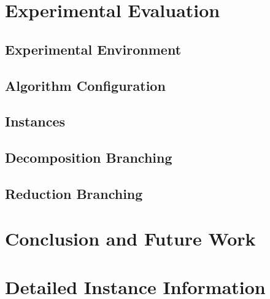 \documentclass[a4paper,UKenglish,cleveref, autoref, thm-restate]{lipics-v2021}
\begin{document}

\section{Experimental Evaluation}

\subsection{Experimental Environment}

\subsection{Algorithm Configuration}
\label{sec:algo_conf}

\subsection{Instances}

\subsection{Decomposition Branching}

\subsection{Reduction Branching}

\section{Conclusion and Future Work}




\appendix

\section{Detailed Instance Information}
\end{document}
